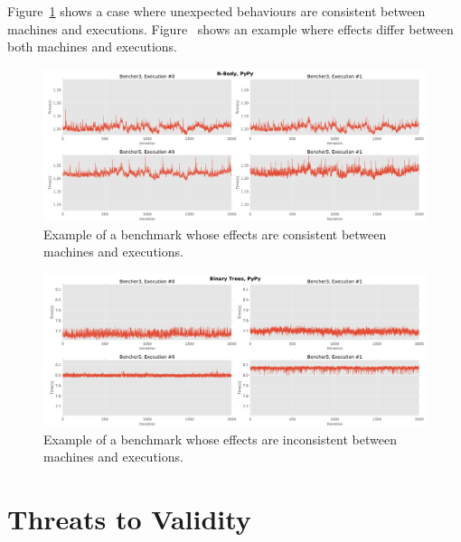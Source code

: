 \documentclass[10pt,preprint]{sigplanconf}
\begin{document}

Figure~\ref{fig:examples:consistent_weirdness1} shows a case where
unexpected behaviours are consistent between machines and executions.
Figure~\label{fig:examples:inconsistent_weirdness1} shows an example where
effects differ between both machines and executions.

\begin{figure}[h!]
\centering
\includegraphics[width=\textwidth]{examples/consistent_weirdness1}
\caption{Example of a benchmark whose effects are consistent between machines and executions.}
\label{fig:examples:consistent_weirdness1}
\end{figure}

\begin{figure}[h!]
\centering
\includegraphics[width=\textwidth]{examples/inconsistent_weirdness1}
\caption{Example of a benchmark whose effects are inconsistent between machines and executions.}
\label{fig:examples:inconsistent_weirdness1}
\end{figure}


\section{Threats to Validity}
\label{sec:threats}

\end{document}
